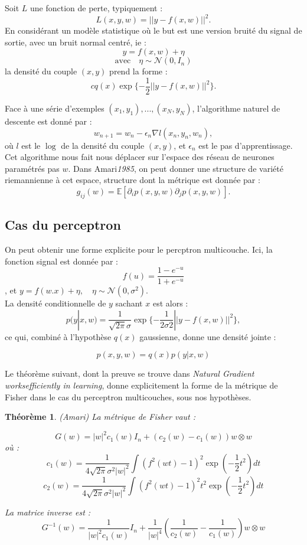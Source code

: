 \documentclass{article}
\newtheorem{thm}{Théorème}
\begin{document}
Soit $L$ une fonction de perte, typiquement : 
\[L(x,y,w)  = ||y-f(x,w)||^2.\] 
En considérant un modèle statistique où le but est une version bruité du signal de sortie, avec un bruit normal centré, ie :
\[y=f(x,w)+\eta\]
\[\text{avec} \quad \eta \sim \mathcal N (0,I_n)\]
la densité du couple $(x,y)$ prend la forme :
\[cq(x)\exp\{-\frac{1}{2}||y-f(x,w)||^2\}.\]

Face à une série d'exemples $(x_1,y_1),...,(x_N,y_N)$, l'algorithme naturel de descente est donné par :
\[w_{n+1}=w_n - \epsilon_n \nabla l(x_n,y_n,w_n), \]
où $l$ est le $\log$ de la densité du couple $(x,y)$, et $\epsilon_n$ est le pas d'apprentissage. Cet algorithme nous fait nous déplacer sur l'espace des réseau de neurones paramétrés pas $w$. Dans Amari\textit{1985}, on peut donner une structure de variété riemannienne à cet espace, structure dont la métrique est donnée par :
\[g_{ij}(w)=\mathbb E[\partial_i p(x,y,w)\partial_j p(x,y,w)].\]

\subsection{Cas du perceptron}

On peut obtenir une forme explicite pour le percptron multicouche.
Ici, la fonction signal est donnée par : \[f(u)=\frac{1-e^{-u}}{1+e^{-u}}\], et $y=f(w.x)+\eta,\quad \eta \sim \mathcal N (0, \sigma^2)$.\\

La densité conditionnelle de $y$ sachant $x$ est alors :
\[p(y|x,w) = \frac{1}{\sqrt{2\pi}\sigma}\exp\{-\frac{1}{2\sigma2}||y-f(x,w)||^2\},\]
ce qui, combiné à l'hypothèse $q(x)$ gaussienne, donne une densité jointe :

\[p(x,y,w) = q(x)p(y|x,w) \]

Le théorème suivant, dont la preuve se trouve dans  \textit{Natural Gradient worksefficiently in learning}, donne explicitement la forme de la métrique de Fisher dans le cas du perceptron multicouches, sous nos hypothèses.

\begin{thm}{(Amari)}
La métrique de Fisher vaut : 

\[G(w)=|w|^2 c_1(w)I_n + (c_2(w)-c_1(w))w\otimes w\]
où :
\[c_1(w)=\frac{1}{4\sqrt{2\pi}\sigma^2|w|^2}\int (f^2(wt)-1)^2\exp(-\frac{1}{2}t^2)dt\]
\[c_2(w)=\frac{1}{4\sqrt{2\pi}\sigma^2|w|^2}\int (f^2(wt)-1)^2t^2\exp(-\frac{1}{2}t^2)dt\]

La matrice inverse est : 
\[G^{-1}(w)=\frac{1}{|w|^2 c_1(w)}I_n+\frac{1}{|w|^4}(\frac{1}{c_2(w)}-\frac{1}{c_1(w)})w\otimes w\]
\end{thm}
 
\end{document}
